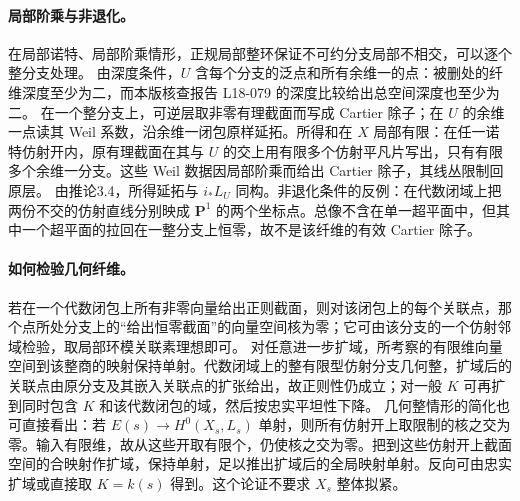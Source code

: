 \paragraph{局部阶乘与非退化。}
在局部诺特、局部阶乘情形，正规局部整环保证不可约分支局部不相交，可以逐个整分支处理。
由深度条件，\(U\) 含每个分支的泛点和所有余维一的点：被删处的纤维深度至少为二，而本版核查报告 L18-079 的深度比较给出总空间深度也至少为二。
在一个整分支上，可逆层取非零有理截面而写成 Cartier 除子；在 \(U\) 的余维一点读其 Weil 系数，沿余维一闭包原样延拓。所得和在 \(X\) 局部有限：在任一诺特仿射开内，原有理截面在其与 \(U\) 的交上用有限多个仿射平凡片写出，只有有限多个余维一分支。这些 Weil 数据因局部阶乘而给出 Cartier 除子，其线丛限制回原层。
由推论3.4，所得延拓与 \(i_*L_U\) 同构。非退化条件的反例：在代数闭域上把两份不交的仿射直线分别映成 \(\mathbf P^1\) 的两个坐标点。总像不含在单一超平面中，但其中一个超平面的拉回在一整分支上恒零，故不是该纤维的有效 Cartier 除子。

\paragraph{如何检验几何纤维。}
若在一个代数闭包上所有非零向量给出正则截面，则对该闭包上的每个关联点，那个点所处分支上的“给出恒零截面”的向量空间核为零；它可由该分支的一个仿射邻域检验，取局部环模关联素理想即可。
对任意进一步扩域，所考察的有限维向量空间到该整商的映射保持单射。代数闭域上的整有限型仿射分支几何整，扩域后的关联点由原分支及其嵌入关联点的扩张给出，故正则性仍成立；对一般 \(K\) 可再扩到同时包含 \(K\) 和该代数闭包的域，然后按忠实平坦性下降。
几何整情形的简化也可直接看出：若 \(E(s)\to H^0(X_s,L_s)\) 单射，则所有仿射开上取限制的核之交为零。输入有限维，故从这些开取有限个，仍使核之交为零。把到这些仿射开上截面空间的合映射作扩域，保持单射，足以推出扩域后的全局映射单射。反向可由忠实扩域或直接取 \(K=k(s)\) 得到。这个论证不要求 \(X_s\) 整体拟紧。
\par\endgroup

\begingroup
\def\Spec{\operatorname{Spec}}
\def\Hom{\operatorname{Hom}}
\def\Grass{\operatorname{Grass}}
\def\Div{\operatorname{Div}}
\def\OO{\mathcal O}
\def\FF{\mathcal F}
\def\HH{\mathcal{H}\!om}
\def\PP{\mathbf P}
\hypertarget{audit:L18-082}{}
